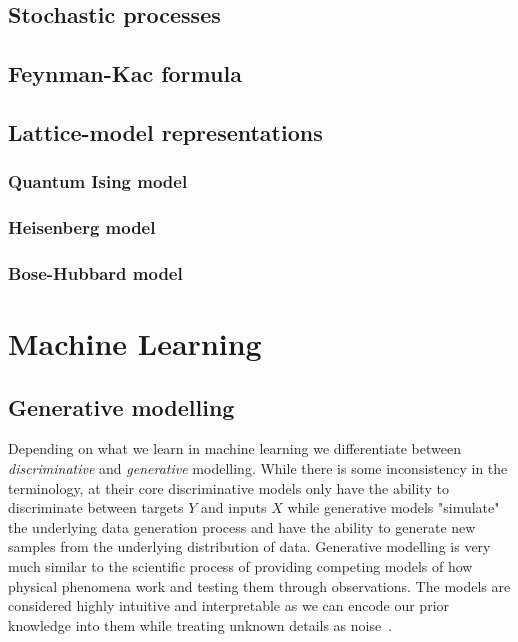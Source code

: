 \subsection{Stochastic processes}
\label{subsec:fk-stoch}

\subsection{Feynman-Kac formula}
\label{subsec:fk-fk}

\subsection{Lattice-model representations}
\label{subsec:fk-latt}

\subsubsection{Quantum Ising model}
\subsubsection{Heisenberg model}
\subsubsection{Bose-Hubbard model}

\newpage
\section{Machine Learning}
\label{sec:ml}

\subsection{Generative modelling}
Depending on what we learn in machine learning we differentiate between \emph{discriminative} and \emph{generative} modelling. While there is some inconsistency in the terminology, at their core discriminative models only have the ability to discriminate between targets $Y$ and inputs $X$ while generative models "simulate" the underlying data generation process and have the ability to generate new samples from the underlying distribution of data. Generative modelling is very much similar to the scientific process of providing competing models of how physical phenomena work and testing them through observations. The models are considered highly intuitive and interpretable as we can encode our prior knowledge into them while treating unknown details as noise~\cite{kingma2017variational}. 

